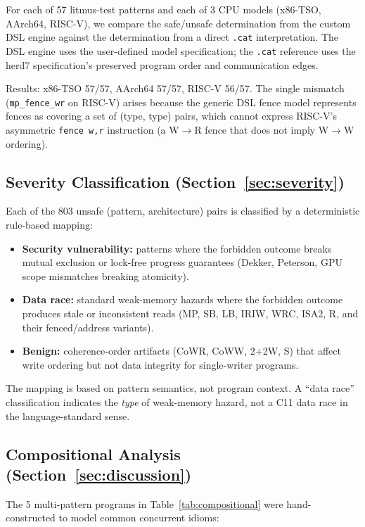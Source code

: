 \documentclass[11pt]{article}
\begin{document}
For each of 57 litmus-test patterns and each of 3 CPU models
(x86-TSO, AArch64, RISC-V), we compare the safe/unsafe determination
from the custom DSL engine against the determination from a direct
\texttt{.cat} interpretation.  The DSL engine uses the user-defined
model specification; the \texttt{.cat} reference uses the herd7
specification's preserved program order and communication edges.

Results: x86-TSO 57/57, AArch64 57/57, RISC-V 56/57.
The single mismatch (\texttt{mp\_fence\_wr} on RISC-V) arises because
the generic DSL fence model represents fences as covering a set of
(type, type) pairs, which cannot express RISC-V's asymmetric
\texttt{fence w,r} instruction (a W$\to$R fence that does not
imply W$\to$W ordering).

\subsection{Severity Classification (Section~\ref{sec:severity})}

Each of the 803 unsafe (pattern, architecture) pairs is classified
by a deterministic rule-based mapping:

\begin{itemize}[nosep]
\item \textbf{Security vulnerability:} patterns where the forbidden
  outcome breaks mutual exclusion or lock-free progress guarantees
  (Dekker, Peterson, GPU scope mismatches breaking atomicity).
\item \textbf{Data race:} standard weak-memory hazards where the
  forbidden outcome produces stale or inconsistent reads
  (MP, SB, LB, IRIW, WRC, ISA2, R, and their fenced/address variants).
\item \textbf{Benign:} coherence-order artifacts (CoWR, CoWW, 2+2W, S)
  that affect write ordering but not data integrity for
  single-writer programs.
\end{itemize}

\noindent
The mapping is based on pattern semantics, not program context.
A ``data race'' classification indicates the \emph{type} of
weak-memory hazard, not a C11 data race in the language-standard sense.

\subsection{Compositional Analysis (Section~\ref{sec:discussion})}

The 5 multi-pattern programs in Table~\ref{tab:compositional} were
hand-constructed to model common concurrent idioms:
\end{document}
